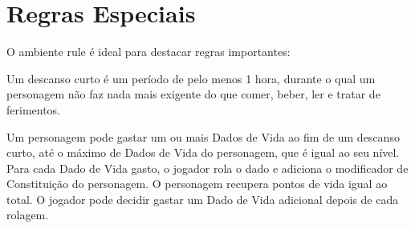 \section{Regras Especiais}

O ambiente rule é ideal para destacar regras importantes:

\begin{rule}

Um descanso curto é um período de pelo menos 1 hora, durante o qual um personagem não faz nada mais exigente do que comer, beber, ler e tratar de ferimentos.

Um personagem pode gastar um ou mais Dados de Vida ao fim de um descanso curto, até o máximo de Dados de Vida do personagem, que é igual ao seu nível. Para cada Dado de Vida gasto, o jogador rola o dado e adiciona o modificador de Constituição do personagem. O personagem recupera pontos de vida igual ao total. O jogador pode decidir gastar um Dado de Vida adicional depois de cada rolagem.
\end{rule}
